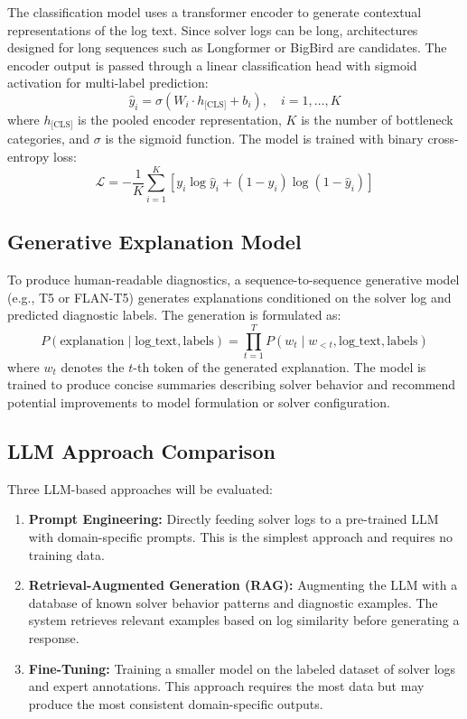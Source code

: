 \documentclass[11pt]{article}
\begin{document}
The classification model uses a transformer encoder to generate contextual representations of the log text. Since solver logs can be long, architectures designed for long sequences such as Longformer or BigBird are candidates. The encoder output is passed through a linear classification head with sigmoid activation for multi-label prediction:
\begin{equation}
    \hat{y}_i = \sigma(W_i \cdot h_{\text{[CLS]}} + b_i), \quad i = 1, \ldots, K
\end{equation}
where $h_{\text{[CLS]}}$ is the pooled encoder representation, $K$ is the number of bottleneck categories, and $\sigma$ is the sigmoid function. The model is trained with binary cross-entropy loss:
\begin{equation}
    \mathcal{L} = -\frac{1}{K} \sum_{i=1}^{K} \left[ y_i \log \hat{y}_i + (1 - y_i) \log(1 - \hat{y}_i) \right]
\end{equation}

\subsection{Generative Explanation Model}

To produce human-readable diagnostics, a sequence-to-sequence generative model (e.g., T5 or FLAN-T5) generates explanations conditioned on the solver log and predicted diagnostic labels. The generation is formulated as:
\begin{equation}
    P(\text{explanation} \mid \text{log\_text}, \text{labels}) = \prod_{t=1}^{T} P(w_t \mid w_{<t}, \text{log\_text}, \text{labels})
\end{equation}
where $w_t$ denotes the $t$-th token of the generated explanation. The model is trained to produce concise summaries describing solver behavior and recommend potential improvements to model formulation or solver configuration.

\subsection{LLM Approach Comparison}

Three LLM-based approaches will be evaluated:
\begin{enumerate}
    \item \textbf{Prompt Engineering:} Directly feeding solver logs to a pre-trained LLM with domain-specific prompts. This is the simplest approach and requires no training data.
    \item \textbf{Retrieval-Augmented Generation (RAG):} Augmenting the LLM with a database of known solver behavior patterns and diagnostic examples. The system retrieves relevant examples based on log similarity before generating a response.
    \item \textbf{Fine-Tuning:} Training a smaller model on the labeled dataset of solver logs and expert annotations. This approach requires the most data but may produce the most consistent domain-specific outputs.
\end{enumerate}
\end{document}
